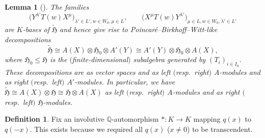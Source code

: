 \documentclass[10pt,a4paper]{amsart}
\newtheorem{Lemma}[Theorem]{Lemma}
\theoremstyle{definition}
\newtheorem{Definition}[Theorem]{Definition}
\numberwithin{equation}{section}
\begin{document}
\begin{Lemma}[{\cite[Section~4.7.5]{macdonald}}]\label{sec:lem-basis-daha}
 The families
 \[
 \bigl(Y^{\lambda'}T(w)X^\mu\bigr)_{\lambda'\in L', w\in W_0, \mu\in L},\qquad
 \bigl(X^\mu T(w) Y^{\lambda'}\bigr)_{\mu\in L, w\in W_0, \lambda'\in L'}
 \]
 are $K$-bases of
 $\tilde{\mathfrak{H}}$ and hence give rise to Poincar\'e--Birkhoff--Witt-like
 decompositions
 \[
 \tilde{\mathfrak{H}}\cong A(X)\otimes\mathfrak{H}_0\otimes A'(Y)
 \cong A'(Y)\otimes\mathfrak{H}_0\otimes A(X),
 \]
 where $\mathfrak{H}_0\le\mathfrak{H}$ is the $($finite-dimensional$)$
 subalgebra generated by $(T_i)_{i\in I_0}$. These decompositions are
 as vector spaces and as left $($resp.\ right$)$ $A$-modules and as
 right $($resp.\ left$)$ $A'$-modules. In particular, we have
$
 \tilde{\mathfrak{H}}\cong A(X)\otimes\mathfrak{H} \cong \mathfrak{H}\otimes A(X)
$
 as left $($resp.\ right$)$ $A$-modules and as right $($resp.\ left$)$
 $\mathfrak{H}$-modules.
\end{Lemma}

\begin{Definition}
 Fix an involutive $\mathbb{Q}$-automorphism $*\colon K\to K$ mapping $q(x)$ to $q(-x)$.
 This exists because we required all $q(x)$ ($x\ne0$) to be transcendent.
\end{Definition}
\end{document}
